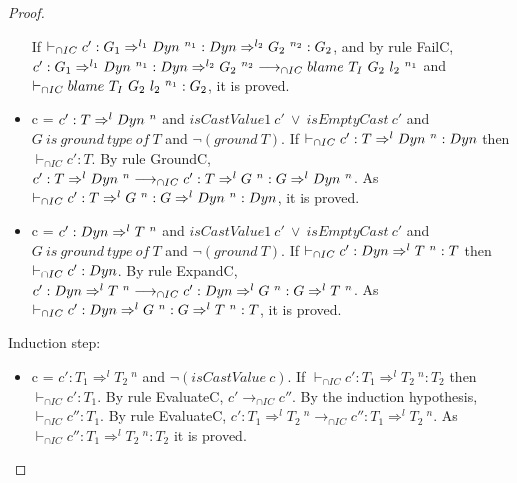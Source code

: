 \documentclass[a4paper]{article}
\begin{document}
\begin{proof}
\begin{itemize}
    If $\vdash_{\cap IC} c' : G_1 \Rightarrow^{l_1} \Dyn\ ^{n_1} : \Dyn \Rightarrow^{l_2} G_2\ ^{n_2} : G_2$, and by rule FailC, $c' : G_1 \Rightarrow^{l_1} Dyn\ ^{n_1} : Dyn \Rightarrow^{l_2} G_2\ ^{n_2} \longrightarrow_{\cap IC} blame\ T_I\ G_2\ l_2\ ^{n_1}$ and $\vdash_{\cap IC} blame\ T_I\ G_2\ l_2\ ^{n_1} : G_2$, it is proved.
    \item c = $c' : T \Rightarrow^l \Dyn\ ^n$ and $isCastValue1\ c'\ \lor\ isEmptyCast\ c'$ and $G\ is\ ground\ type\ of\ T$ and $\neg(ground\ T)$.
    If $\vdash_{\cap IC} c' : T \Rightarrow^l Dyn\ ^n : Dyn$ then $\vdash_{\cap IC} c' : T$.
    By rule GroundC, $c' : T \Rightarrow^l \Dyn\ ^n \longrightarrow_{\cap IC} c' : T \Rightarrow^l G\ ^n : G \Rightarrow^l \Dyn\ ^n$.
    As $\vdash_{\cap IC} c' : T \Rightarrow^l G\ ^n : G \Rightarrow^l Dyn\ ^n : Dyn$, it is proved.
    \item c = $c' : \Dyn \Rightarrow^l T\ ^n$ and $isCastValue1\ c'\ \lor\ isEmptyCast\ c'$ and $G\ is\ ground\ type\ of\ T$ and $\neg(ground\ T)$.
    If $\vdash_{\cap IC} c' : Dyn \Rightarrow^l T\ ^n : T$ then $\vdash_{\cap IC} c' : Dyn$.
    By rule ExpandC, $c' : \Dyn \Rightarrow^l T\ ^n \longrightarrow_{\cap IC} c' : \Dyn \Rightarrow^l G\ ^n : G \Rightarrow^l T\ ^n$.
    As $\vdash_{\cap IC} c' : Dyn \Rightarrow^l G\ ^n : G \Rightarrow^l T\ ^n : T$, it is proved.
    \begin{comment}
    \item c = $c' : T_1 \Rightarrow^l T_2\ ^n$ and $isCastValue1\ c'\ \lor\ isEmptyCast\ c'$ and $initialType(c) = T_I$.
    If $\vdash_{\cap IC} c' : T_1 \Rightarrow^l T_2\ ^n : T_2$, and by rule TriggerStuckC, $c' : T_1 \Rightarrow^l T_2\ ^n \longrightarrow_{\cap IC} \stuckcast{T_I}{T_2}{n}$, then $\vdash_{\cap IC} \stuckcast{T_I}{T_2}{n} : T_2$.
    \end{comment}
\end{itemize}
Induction step:
\begin{itemize}
    \item c = $c' : T_1 \Rightarrow^l T_2\ ^n$ and $\neg(isCastValue\ c)$.
    If $\vdash_{\cap IC} c' : T_1 \Rightarrow^l T_2\ ^n : T_2$ then $\vdash_{\cap IC} c' : T_1$.
    By rule EvaluateC, $c' \longrightarrow_{\cap IC} c''$.
    By the induction hypothesis, $\vdash_{\cap IC} c'' : T_1$.
    By rule EvaluateC, $c' : T_1 \Rightarrow^l T_2\ ^n \longrightarrow_{\cap IC} c'' : T_1 \Rightarrow^l T_2\ ^n$.
    As $\vdash_{\cap IC} c'' : T_1 \Rightarrow^l T_2\ ^n : T_2$ it is proved.
\end{itemize}
\end{proof}
\end{document}
